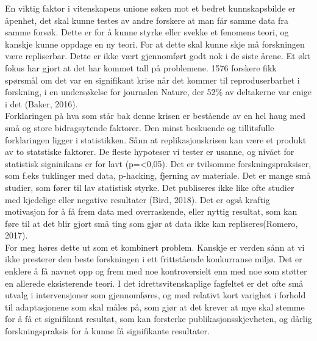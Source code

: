 \documentclass[
]{book}
\begin{document}
En viktig faktor i vitenskapens unione søken mot et bedret kunnskapsbilde er åpenhet, det skal kunne testes av andre forskere at man får samme data fra samme forsøk. Dette er for å kunne styrke eller svekke et fenomens teori, og kanskje kunne oppdage en ny teori. For at dette skal kunne skje må forskningen være repliserbar. Dette er ikke vært gjennomført godt nok i de siste årene. Et økt fokus har gjort at det har kommet tall på problemene. 1576 forskere fikk spørsmål om det var en signifikant krise når det kommer til reproduserbarhet i forskning, i en undersøkelse for journalen Nature, der 52\% av deltakerne var enige i det (Baker, 2016).\\
Forklaringen på hva som står bak denne krisen er bestående av en hel haug med små og store bidragsytende faktorer. Den minst beskuende og tillitsfulle forklaringen ligger i statistikken. Sånn at replikasjonskrisen kan være et produkt av to statstiske faktorer. De fleste hypoteser vi tester er usanne, og nivået for statistisk signinikans er for lavt (p=\textless0,05). Det er tvilsomme forskningspraksiser, som f.eks tuklinger med data, p-hacking, fjerning av materiale. Det er mange små studier, som fører til lav statistisk styrke. Det publiseres ikke like ofte studier med kjedelige eller negative resultater (Bird, 2018). Det er også kraftig motivasjon for å få frem data med overraskende, eller nyttig resultat, som kan føre til at det blir gjort små ting som gjør at data ikke kan repliseres(Romero, 2017).\\
For meg høres dette ut som et kombinert problem. Kanskje er verden sånn at vi ikke presterer den beste forskningen i ett frittstående konkurranse miljø. Det er enklere å få navnet opp og frem med noe kontroversielt enn med noe som støtter en allerede eksisterende teori. I det idrettsvitenskaplige fagfeltet er det ofte små utvalg i intervensjoner som gjennomføres, og med relativt kort varighet i forhold til adaptasjonene som skal måles på, som gjør at det krever at mye skal stemme for å få et signifikant resultat, som kan forsterke publikasjonsskjevheten, og dårlig forskningspraksis for å kunne få signifikante resultater.

  
\end{document}
